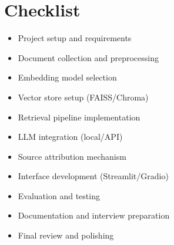 \section*{Checklist}
\begin{itemize}
\item[x] Project setup and requirements
\item[ ] Document collection and preprocessing
\item[ ] Embedding model selection
\item[ ] Vector store setup (FAISS/Chroma)
\item[ ] Retrieval pipeline implementation
\item[ ] LLM integration (local/API)
\item[ ] Source attribution mechanism
\item[ ] Interface development (Streamlit/Gradio)
\item[ ] Evaluation and testing
\item[ ] Documentation and interview preparation
\item[ ] Final review and polishing
\end{itemize}
